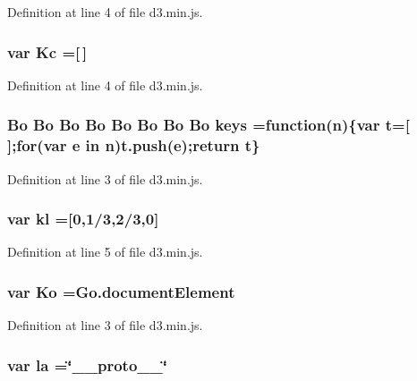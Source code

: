 Definition at line 4 of file d3.\+min.\+js.

\subsubsection[{Kc}]{\setlength{\rightskip}{0pt plus 5cm}var Kc =[$\,$]}\label{d3_8min_8js_aed31f1202e17b8a9ef66567204b04793}


Definition at line 4 of file d3.\+min.\+js.

\subsubsection[{keys}]{ {\bf Bo} {\bf Bo} {\bf Bo} {\bf Bo} {\bf Bo} {\bf Bo} {\bf Bo} {\bf Bo} keys =function({\bf n})\{var t=[$\,$];{\bf for}(var {\bf e} in {\bf n})t.\+push({\bf e});{\bf return} t\}}\label{d3_8min_8js_adc1ca1343cc90b0bd3627a6186440762}


Definition at line 3 of file d3.\+min.\+js.

\subsubsection[{kl}]{\setlength{\rightskip}{0pt plus 5cm}var kl =[0,1/3,2/3,0]}\label{d3_8min_8js_ad63830c418f88e35b3cbc9834d36ac91}


Definition at line 5 of file d3.\+min.\+js.

\subsubsection[{Ko}]{\setlength{\rightskip}{0pt plus 5cm}var Ko =Go.\+document\+Element}\label{d3_8min_8js_a262f1903a7eeea4aefc851e4a1e1719a}


Definition at line 3 of file d3.\+min.\+js.

\subsubsection[{la}]{\setlength{\rightskip}{0pt plus 5cm}var la =\char`\"{}\+\_\+\+\_\+proto\+\_\+\+\_\+\char`\"{}}\label{d3_8min_8js_aea27fd774403cd75c00a2c8b91f5aa9e}


